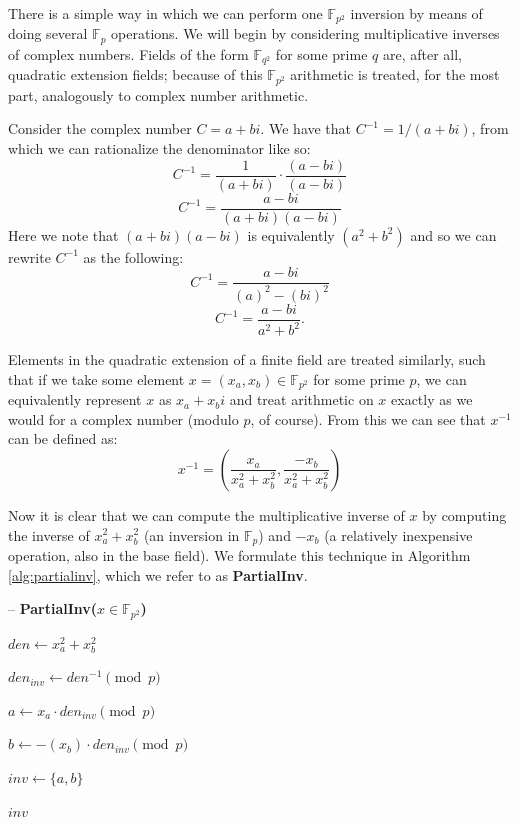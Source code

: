 There is a simple way in which we can perform one $\mathbb{F}_{p^{2}}$ inversion by means of doing several $\mathbb{F}_{p}$ operations. We will begin by considering multiplicative inverses of complex numbers. Fields of the form $\mathbb{F}_{q^{2}}$ for some prime $q$ are, after all, quadratic extension fields; because of this $\mathbb{F}_{p^{2}}$ arithmetic is treated, for the most part, analogously to complex number arithmetic.

Consider the complex number $C = a + bi$. We have that $C^{-1} = 1 / (a + bi)$, from which we can rationalize the denominator like so:\\
$$
C^{-1} = \frac {1}{(a + bi)} \cdot \frac{(a - bi)}{(a - bi)}
$$
$$
C^{-1} = \frac {a - bi}{(a + bi)(a - bi)}
$$
Here we note that $(a + bi)(a - bi)$ is equivalently $(a^2 + b^2)$ and so we can rewrite $C^{-1}$ as the following:
$$
C^{-1} = \frac {a - bi}{(a)^2 - (bi)^2}
$$
$$
C^{-1} = \frac {a - bi}{a^2 + b^2}.
$$

Elements in the quadratic extension of a finite field are treated similarly, such that if we take some element $x = (x_{a}, x_{b}) \in \mathbb{F}_{p^{2}}$ for some prime $p$, we can equivalently represent $x$ as $x_{a} + x_{b}i$ and treat arithmetic on $x$ exactly as we would for a complex number (modulo $p$, of course). From this we can see that $x^{-1}$ can be defined as:
$$
x^{-1} = (\frac {x_{a}}{x_{a}^2 + x_{b}^2}, \frac {-x_{b}}{x_{a}^2 + x_{b}^2})
$$

Now it is clear that we can compute the multiplicative inverse of $x$ by computing the inverse of $x_{a}^2 + x_{b}^2$ (an inversion in $\mathbb{F}_{p}$) and $-x_{b}$ (a relatively inexpensive operation, also in the base field). We formulate this technique in Algorithm \ref{alg:partialinv}, which we refer to as \textbf{PartialInv}.\\

\begin{algorithm}[!h]
\label{alg:partialinv}
\caption{-- \textbf{PartialInv($x \in \mathbb{F}_{p^{2}}$)}}\label{alg:partialinv}
\begin{algorithmic}[1]
\State $den \gets x_{a}^{2} + x_{b}^{2}$

\State $den_{inv} \gets den^{-1} \pmod{p}$

\State $a \gets x_{a} \cdot den_{inv} \pmod{p}$

\State $b \gets -(x_{b}) \cdot den_{inv} \pmod{p}$

\State $inv \gets \{a, b\}$

\State \Return $inv$
\end{algorithmic}
\end{algorithm}

